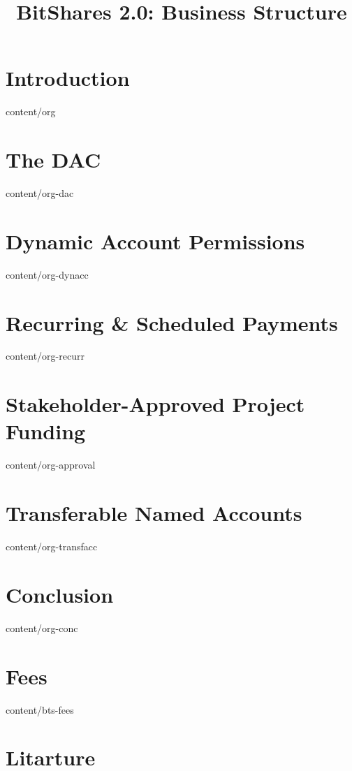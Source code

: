 \documentclass[conference,final,10pt,a4paper]{IEEEtran}
\title{BitShares 2.0: Business Structure}
\author{}
\begin{document}
\sloppy
\maketitle

\begin{abstract}
\end{abstract}
\section  { Introduction                         }  { content/org           } 
\section  { The DAC                              }  { content/org-dac       }
\section  { Dynamic Account Permissions          }  { content/org-dynacc    } 
\section  { Recurring \& Scheduled Payments      }  { content/org-recurr    } 
\section  { Stakeholder-Approved Project Funding }  { content/org-approval  } 
\section  { Transferable Named Accounts          }  { content/org-transfacc } 
\section  { Conclusion                           }  { content/org-conc      } 
\section  { Fees                                 }  { content/bts-fees      } 
\section* { Litarture                            } 
\end{document}
